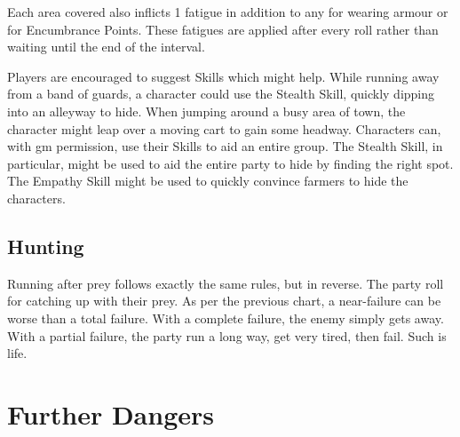 \begin{multicols}{2}
Each area covered also inflicts 1 \gls{fatigue} in addition to any for wearing armour or for Encumbrance Points.
These \glspl{fatigue} are applied after every roll rather than waiting until the end of the interval.

Players are encouraged to suggest Skills which might help. While running away from a band of guards, a character could use the Stealth Skill, quickly dipping into an alleyway to hide. When jumping around a busy area of town, the character might leap over a moving cart to gain some headway. Characters can, with \gls{gm} permission, use their Skills to aid an entire group. The Stealth Skill, in particular, might be used to aid the entire party to hide by finding the right spot. The Empathy Skill might be used to quickly convince farmers to hide the characters.

\subsection{Hunting}

Running after prey follows exactly the same rules, but in reverse.
The party roll for catching up with their prey.
As per the previous chart, a near-failure can be worse than a total failure.
With a complete failure, the enemy simply gets away.
With a partial failure, the party run a long way, get very tired, then fail.
Such is life.

\end{multicols}

\huntchart

\section{Further Dangers}

